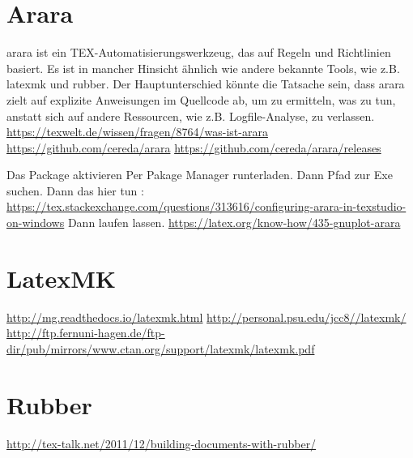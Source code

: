 \section{Arara}
arara ist ein TEX-Automatisierungswerkzeug, das auf Regeln und Richtlinien basiert. Es ist in mancher Hinsicht ähnlich wie andere bekannte Tools, wie z.B. latexmk\autocite{latexmk} und rubber\autocite{rubber}. Der Hauptunterschied könnte die Tatsache sein, dass arara zielt auf explizite Anweisungen im Quellcode ab, um zu ermitteln, was zu tun, anstatt sich auf andere Ressourcen, wie z.B. Logfile-Analyse, zu verlassen.
\url{https://texwelt.de/wissen/fragen/8764/was-ist-arara}
\url{https://github.com/cereda/arara}
\url{https://github.com/cereda/arara/releases}

Das Package aktivieren
Per Pakage Manager runterladen.
Dann Pfad zur Exe suchen. 
Dann das hier tun : \url{https://tex.stackexchange.com/questions/313616/configuring-arara-in-texstudio-on-windows}
Dann laufen lassen.
\url{https://latex.org/know-how/435-gnuplot-arara}
\section{LatexMK}

\url{http://mg.readthedocs.io/latexmk.html}
\url{http://personal.psu.edu/jcc8//latexmk/}
\url{http://ftp.fernuni-hagen.de/ftp-dir/pub/mirrors/www.ctan.org/support/latexmk/latexmk.pdf}

\section{Rubber}
\url{http://tex-talk.net/2011/12/building-documents-with-rubber/}
